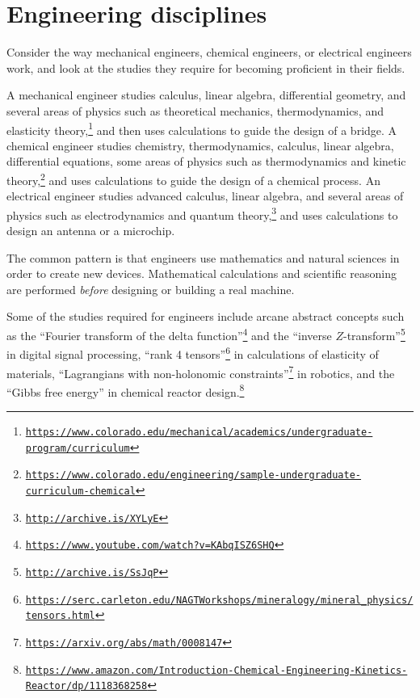 \section{Engineering disciplines }

Consider the way mechanical engineers, chemical engineers, or electrical
engineers work, and look at the studies they require for becoming
proficient in their fields.

A mechanical engineer studies calculus, linear algebra, differential
geometry, and several areas of physics such as theoretical mechanics,
thermodynamics, and elasticity theory,\footnote{\texttt{\href{https://www.colorado.edu/mechanical/academics/undergraduate-program/curriculum}{https://www.colorado.edu/mechanical/academics/undergraduate-program/curriculum}}}
and then uses calculations to guide the design of a bridge. A chemical
engineer studies chemistry, thermodynamics, calculus, linear algebra,
differential equations, some areas of physics such as thermodynamics
and kinetic theory,\footnote{\texttt{\href{https://www.colorado.edu/engineering/sample-undergraduate-curriculum-chemical}{https://www.colorado.edu/engineering/sample-undergraduate-curriculum-chemical}}}
and uses calculations to guide the design of a chemical process. An
electrical engineer studies advanced calculus, linear algebra, and
several areas of physics such as electrodynamics and quantum theory,\footnote{\texttt{\href{http://archive.is/XYLyE}{http://archive.is/XYLyE}}}
and uses calculations to design an antenna or a microchip.

The common pattern is that engineers use mathematics and natural sciences
in order to create new devices. Mathematical calculations and scientific
reasoning are performed \emph{before} designing or building a real
machine.

Some of the studies required for engineers include arcane abstract
concepts such as the \textsf{``}Fourier transform of the delta function\textsf{''}\footnote{\texttt{\href{https://www.youtube.com/watch?v=KAbqISZ6SHQ}{https://www.youtube.com/watch?v=KAbqISZ6SHQ}}}
and the \textsf{``}inverse $Z$-transform\textsf{''}\footnote{\texttt{\href{http://archive.is/SsJqP}{http://archive.is/SsJqP}}}
in digital signal processing, \textsf{``}rank 4 tensors\textsf{''}\footnote{\texttt{\href{https://serc.carleton.edu/NAGTWorkshops/mineralogy/mineral_physics/tensors.html}{https://serc.carleton.edu/NAGTWorkshops/mineralogy/mineral\_physics/tensors.html}}}
in calculations of elasticity of materials, \textsf{``}Lagrangians with non-holonomic
constraints\textsf{''}\footnote{\texttt{\href{https://arxiv.org/abs/math/0008147}{https://arxiv.org/abs/math/0008147}}}
in robotics, and the \textsf{``}Gibbs free energy\textsf{''} in chemical reactor design.\footnote{\texttt{\href{https://www.amazon.com/Introduction-Chemical-Engineering-Kinetics-Reactor/dp/1118368258}{https://www.amazon.com/Introduction-Chemical-Engineering-Kinetics-Reactor/dp/1118368258}}}

